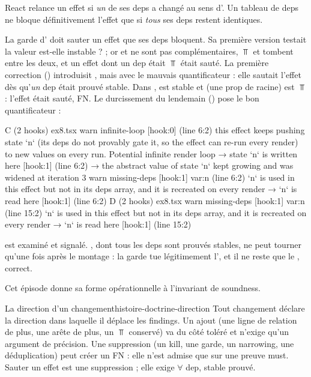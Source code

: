 \begin{react}
React relance un effet si \emph{un} de ses deps a changé au sens d'. Un tableau de deps ne bloque définitivement l'effet que si \emph{tous} ses deps restent identiques.
\end{react}

La garde d' doit sauter un effet que ses deps bloquent. Sa première version testait \og la valeur est-elle instable ?\fg{} ; or  et  ne sont pas complémentaires, $\Top$ et  tombent entre les deux, et un effet dont un dep était $\Top$ était sauté. La première correction () introduisit , mais avec le mauvais quantificateur : elle sautait l'effet dès qu'\emph{un} dep était prouvé stable. Dans ,  est stable et  (une prop de racine) est $\Top$ : l'effet était sauté, FN. Le durcissement du lendemain () pose le bon quantificateur :


\begin{sortie}
  C  (2 hooks)  ex8.tsx
    warn   infinite-loop  [hook:0]  (line 6:2)  this effect keeps pushing state `n` (its deps do not provably gate it, so the effect can re-run every render) to new values on every run. Potential infinite render loop
       → state `n` is written here [hook:1] (line 6:2)
       → the abstract value of state `n` kept growing and was widened at iteration 3
    warn   missing-deps  [hook:1]  var:n  (line 6:2)  `n` is used in this effect but not in its deps array, and it is recreated on every render
       → `n` is read here [hook:1] (line 6:2)
  D  (2 hooks)  ex8.tsx
    warn   missing-deps  [hook:1]  var:n  (line 15:2)  `n` is used in this effect but not in its deps array, and it is recreated on every render
       → `n` is read here [hook:1] (line 15:2)
\end{sortie}

 est examiné et signalé. , dont tous les deps sont prouvés stables, ne peut tourner qu'une fois après le montage : la garde tue légitimement l', et il ne reste que le , correct.

Cet épisode donne sa forme opérationnelle à l'invariant de soundness.

\begin{invariant}{La direction d'un changement}{histoire-doctrine-direction}
Tout changement déclare la direction dans laquelle il déplace les findings. Un ajout (une ligne de relation de plus, une arête de plus, un $\Top$ conservé) va du côté toléré et n'exige qu'un argument de précision. Une suppression (un kill, une garde, un narrowing, une déduplication) peut créer un FN : elle n'est admise que sur une preuve must. Sauter un effet est une suppression ; elle exige \og $\forall$ dep, stable prouvé\fg{}.
\end{invariant}

